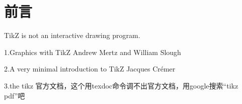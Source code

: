 \documentclass[11pt,oneside]{book}
\begin{document}
\frontmatter

\author{万泽}
\titleLC

\chapter*{前言}
\begin{common-format}
TikZ is not an interactive drawing program.

1.Graphics with TikZ Andrew Mertz and William Slough

2.A very minimal introduction to TikZ Jacques Crémer

3.the tikz 官方文档，这个用texdoc命令调不出官方文档，用google搜索“tikz pdf”吧

\end{common-format}


\setcounter{tocdepth}{2}
\tableofcontents
\end{document}
